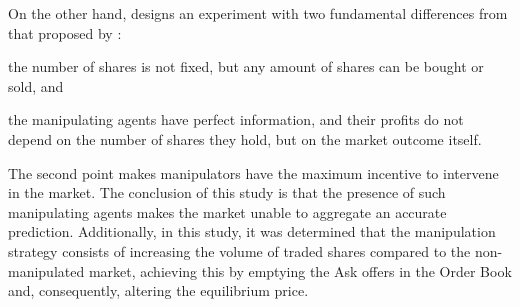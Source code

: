 On the other hand, \citeauthor{deck2013affecting} designs an experiment with two fundamental differences from that proposed by : \begin{enumerate*}[label=(\roman*)]
    \item the number of shares is not fixed, but any amount of shares can be bought or sold, and
    \item the manipulating agents have perfect information, and their profits do not depend on the number of shares they hold, but on the market outcome itself.
\end{enumerate*} 
The second point makes manipulators have the maximum incentive to intervene in the market. The conclusion of this study is that the presence of such manipulating agents makes the market unable to aggregate an accurate prediction. Additionally, in this study, it was determined that the manipulation strategy consists of increasing the volume of traded shares compared to the non-manipulated market, achieving this by emptying the Ask offers in the Order Book and, consequently, altering the equilibrium price.